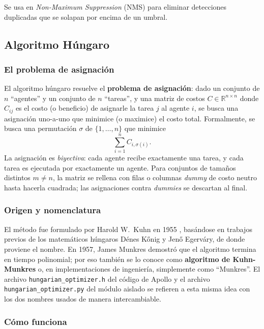 Se usa en \textit{Non-Maximum Suppression} (NMS) para eliminar detecciones duplicadas que se solapan por encima de un umbral.

\subsection{Algoritmo Húngaro}
\label{sec:algoritmo_hungaro}

\subsubsection{El problema de asignación}

El algoritmo húngaro \cite{kuhn1955hungarian} resuelve el \textbf{problema de asignación}: dado un conjunto de $n$ ``agentes'' y un conjunto de $n$ ``tareas'', y una matriz de costos $C \in \mathbb{R}^{n\times n}$ donde $C_{ij}$ es el costo (o beneficio) de asignarle la tarea $j$ al agente $i$, se busca una asignación uno-a-uno que minimice (o maximice) el costo total. Formalmente, se busca una permutación $\sigma$ de $\{1,\dots,n\}$ que minimice
\[
\sum_{i=1}^{n} C_{i,\sigma(i)}.
\]
La asignación es \textit{biyectiva}: cada agente recibe exactamente una tarea, y cada tarea es ejecutada por exactamente un agente. Para conjuntos de tamaños distintos $m\neq n$, la matriz se rellena con filas o columnas \textit{dummy} de costo neutro hasta hacerla cuadrada; las asignaciones contra \textit{dummies} se descartan al final.

\subsubsection{Origen y nomenclatura}

El método fue formulado por Harold W.\ Kuhn en 1955 \cite{kuhn1955hungarian}, basándose en trabajos previos de los matemáticos húngaros Dénes Kőnig y Jenő Egerváry, de donde proviene el nombre. En 1957, James Munkres demostró que el algoritmo termina en tiempo polinomial; por eso también se lo conoce como \textbf{algoritmo de Kuhn-Munkres} o, en implementaciones de ingeniería, simplemente como ``Munkres''. El archivo \texttt{hungarian\_optimizer.h} del código de Apollo y el archivo \texttt{hungarian\_optimizer.py} del módulo aislado se refieren a esta misma idea con los dos nombres usados de manera intercambiable.

\subsubsection{Cómo funciona}

